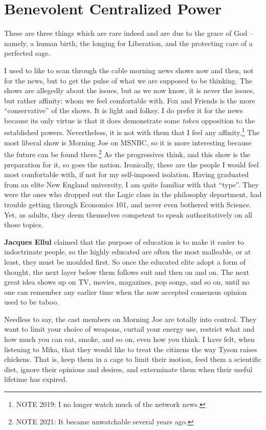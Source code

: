 \section{Benevolent Centralized Power}

\begin{quotex}
These are three things which are rare indeed and are due to the grace of God -- namely, a human birth, the longing for Liberation, and the protecting care of a perfected sage.
\end{quotex}


I used to like to scan through the cable morning news shows now and then, not for the news, but to get the pulse of what we are supposed to be thinking. The shows are allegedly about the issues, but as we now know, it is never the issues, but rather affinity: whom we feel comfortable with. Fox and Friends is the more ``conservative'' of the shows. It is light and folksy. I do prefer it for the news because its only virtue is that it does demonstrate some \emph{token} opposition to the established powers. Nevertheless, it is not with them that I feel any affinity.\footnote{NOTE 2019: I no longer watch much of the network news.} The most liberal show is Morning Joe on MSNBC, so it is more interesting because the future can be found there.\footnote{NOTE 2021: It became unwatchable several years ago.} As the progressives think, and this show is the preparation for it, so goes the nation. Ironically, these are the people I would feel most comfortable with, if not for my self-imposed isolation. Having graduated from an elite New England university, I am quite familiar with that ``type''. They were the ones who dropped out the Logic class in the philosophy department, had trouble getting through Economics 101, and never even bothered with Science. Yet, as adults, they deem themselves competent to speak authoritatively on all those topics.

\textbf{Jacques Ellul} claimed that the purpose of education is to make it easier to indoctrinate people, so the highly educated are often the most malleable, or at least, they must be moulded first. So once the educated elite adopt a form of thought, the next layer below them follows suit and then on and on. The next great idea shows up on TV, movies, magazines, pop songs, and so on, until no one can remember any earlier time when the now accepted consensus opinion used to be taboo.

Needless to say, the cast members on Morning Joe are totally into control. They want to limit your choice of weapons, curtail your energy use, restrict what and how much you can eat, smoke, and so on, even how you think. I have felt, when listening to Mika, that they would like to treat the citizens the way Tyson raises chickens. That is, keep them in a cage to limit their motion, feed them a scientific diet, ignore their opinions and desires, and exterminate them when their useful lifetime has expired.

